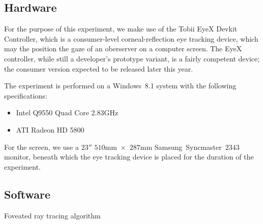 \subsection{Hardware}
For the purpose of this experiment, we make use of the Tobii EyeX Devkit Controller, which is a consumer-level corneal-reflection eye tracking device, which may the position the gaze of an oberserver on a computer screen.
The EyeX controller, while still a developer's prototype variant, is a fairly competent device; the consumer version expected to be released later this year.

The experiment is performed on a Windows~8.1 system with the following specifications:
\begin{itemize}
\setlength\itemsep{0em}
\item Intel Q9550 Quad Core 2.83GHz
\item ATI Radeon HD 5800
\end{itemize}

For the screen, we use a $23''$ $510$mm~$\times$~$287$mm Samsung~Syncmaster~$2343$ monitor, beneath which the eye tracking device is placed for the duration of the experiment.

\subsection{Software}


\begin{algorithm}
\begin{algorithmic}[1]
\caption{Foveated ray tracing algorithm}\label{algfov}
\EndProcedure
\end{algorithmic}
\end{algorithm}




